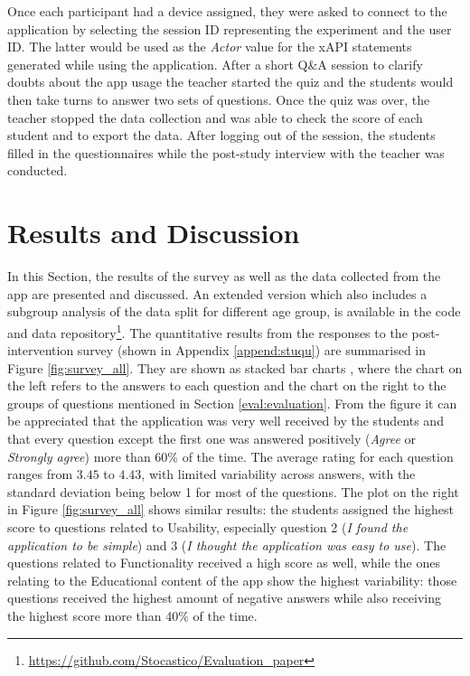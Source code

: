 Once each participant had a device assigned, they were asked to connect to the application by selecting the session ID representing the experiment and the user ID. The latter would be used as the \textit{Actor} value for the xAPI statements generated while using the application.
After a short Q\&A session to clarify doubts about the app usage the teacher started the quiz and the students would then take turns to answer two sets of questions.
Once the quiz was over, the teacher stopped the data collection and was able to check the score of each student and to export the data.
After logging out of the session, the students filled in the questionnaires while the post-study interview with the teacher was conducted.


\section{Results and Discussion}\label{eval:results}

In this Section, the results of the survey as well as the data collected from the app are presented and discussed. An extended version which also includes a subgroup analysis of the data split for different age group, is available in the code and data repository\footnote{\url{https://github.com/Stocastico/Evaluation_paper}}. The quantitative results from the responses to the post-intervention survey (shown in Appendix \ref{append:stuqu}) are summarised in Figure \ref{fig:survey_all}. They are shown as stacked bar charts \citep{friedman1999rating}, where the chart on the left  refers to the answers to each question and the chart on the right to the groups of questions mentioned in Section \ref{eval:evaluation}.
From the figure it can be appreciated that the application was very well received by the students and that every question except the first one was answered positively (\textit{Agree} or \textit{Strongly agree}) more than 60\% of the time.
The average rating for each question ranges from $3.45$ to $4.43$, with limited variability across answers, with the standard deviation being below 1 for most of the questions.
The plot on the right in Figure \ref{fig:survey_all} shows similar results: the students assigned the highest score to questions related to Usability, especially question 2 (\textit{I found the application to be simple}) and 3 (\textit{I thought the application was easy to use}). The questions related to Functionality received a high score as well, while the ones relating to the Educational content of the app show the highest variability: those questions received the highest amount of negative answers while also receiving the highest score more than 40\% of the time. 

